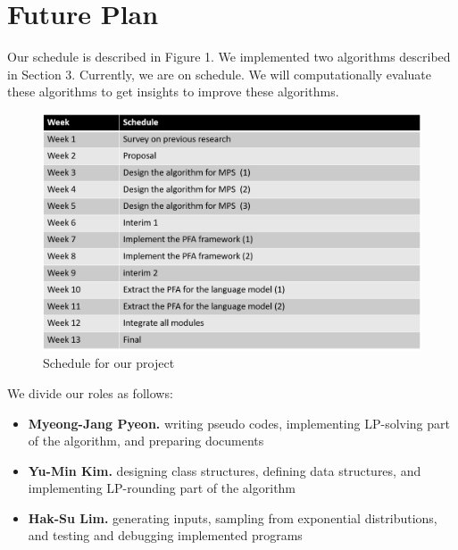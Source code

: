 \documentclass[a4paper]{article}
\begin{document}
\section{Future Plan}
Our schedule is described in Figure 1. We implemented two algorithms described in Section 3. Currently, we are on schedule. We will computationally evaluate these algorithms to get insights to improve these algorithms. 
\begin{figure}[htbp]
\begin{center}
\includegraphics[scale=0.35,bb=0 0 922 311]{Schedule}
\caption{Schedule for our project} \label{fig:label}
\end{center}
\end{figure}

\indent We divide our roles as follows:
\begin{itemize}
\item \textbf{Myeong-Jang Pyeon.} writing pseudo codes, implementing LP-solving part of the algorithm, and preparing documents
\item \textbf{Yu-Min Kim.} designing class structures, defining data structures, and implementing LP-rounding part of the algorithm
\item \textbf{Hak-Su Lim.} generating inputs, sampling from exponential distributions, and testing and debugging implemented programs
\end{itemize}



\end{document}
